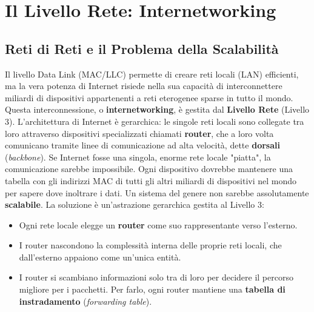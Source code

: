 \chapter{Il Livello Rete: Internetworking}
\section{Reti di Reti e il Problema della Scalabilità}
Il livello Data Link (MAC/LLC) permette di creare reti locali (LAN) efficienti, ma la vera potenza di Internet risiede nella sua capacità di interconnettere miliardi di dispositivi appartenenti a reti eterogenee sparse in tutto il mondo. Questa interconnessione, o \textbf{internetworking}, è gestita dal \textbf{Livello Rete} (Livello 3).
L'architettura di Internet è gerarchica: le singole reti locali sono collegate tra loro attraverso dispositivi specializzati chiamati \textbf{router}, che a loro volta comunicano tramite linee di comunicazione ad alta velocità, dette \textbf{dorsali} (\textit{backbone}).
Se Internet fosse una singola, enorme rete locale "piatta", la comunicazione sarebbe impossibile. Ogni dispositivo dovrebbe mantenere una tabella con gli indirizzi MAC di tutti gli altri miliardi di dispositivi nel mondo per sapere dove inoltrare i dati. Un sistema del genere non sarebbe assolutamente \textbf{scalabile}.
La soluzione è un'astrazione gerarchica gestita al Livello 3:
\begin{itemize}
    \item Ogni rete locale elegge un \textbf{router} come suo rappresentante verso l'esterno.
    \item I router nascondono la complessità interna delle proprie reti locali, che dall'esterno appaiono come un'unica entità.
    \item I router si scambiano informazioni solo tra di loro per decidere il percorso migliore per i pacchetti. Per farlo, ogni router mantiene una \textbf{tabella di instradamento} (\textit{forwarding table}).
\end{itemize}


